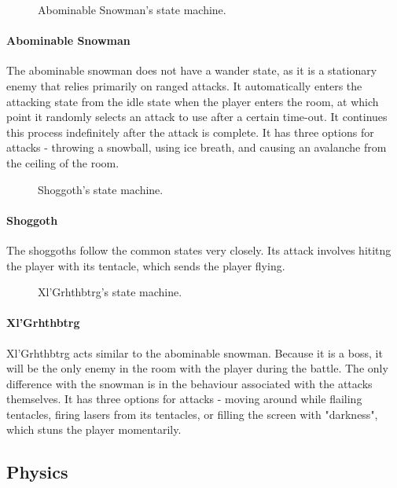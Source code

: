 \documentclass{article}
\begin{document}
\begin{figure}[h!]
{

}
\caption{Abominable Snowman's state machine.}
\label{FSMSnowman}
\end{figure}

\paragraph{Abominable Snowman}
The abominable snowman does not have a wander state, as it is a stationary enemy that relies primarily on ranged attacks.  It automatically enters the attacking state from the idle state when the player enters the room, at which point it randomly selects an attack to use after a certain time-out.  It continues this process indefinitely after the attack is complete.  It has three options for attacks - throwing a snowball, using ice breath, and causing an avalanche from the ceiling of the room.

\begin{figure}[h!]
{

}
\caption{Shoggoth's state machine.}
\label{FSMShoggoth}
\end{figure}

\paragraph{Shoggoth}
The shoggoths follow the common states very closely.  Its attack involves hititng the player with its tentacle, which sends the player flying.

\begin{figure}[h!]
{

}
\caption{Xl'Grhthbtrg's state machine.}
\label{FSMBoss}
\end{figure}

\paragraph{Xl'Grhthbtrg}
Xl'Grhthbtrg acts similar to the abominable snowman.  Because it is a boss, it will be the only enemy in the room with the player during the battle.  The only difference with the snowman is in the behaviour associated with the attacks themselves.  It has three options for attacks - moving around while flailing tentacles, firing lasers from its tentacles, or filling the screen with "darkness", which stuns the player momentarily.

\subsection{Physics}
\end{document}
